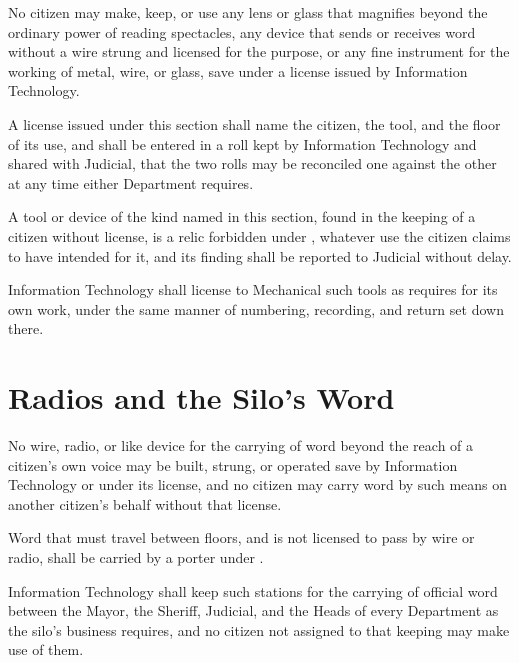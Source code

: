 No citizen may make, keep, or use any lens or glass that magnifies beyond the ordinary power of reading spectacles, any device that sends or receives word without a wire strung and licensed for the purpose, or any fine instrument for the working of metal, wire, or glass, save under a license issued by Information Technology.

\begin{clauses}
\item A license issued under this section shall name the citizen, the tool, and the floor of its use, and shall be entered in a roll kept by Information Technology and shared with Judicial, that the two rolls may be reconciled one against the other at any time either Department requires.
\item A tool or device of the kind named in this section, found in the keeping of a citizen without license, is a relic forbidden under , whatever use the citizen claims to have intended for it, and its finding shall be reported to Judicial without delay.
\item Information Technology shall license to Mechanical such tools as  requires for its own work, under the same manner of numbering, recording, and return set down there.
\end{clauses}

\section{Radios and the Silo's Word}
\label{sec:it:radios-and-the-silos-word}

No wire, radio, or like device for the carrying of word beyond the reach of a citizen's own voice may be built, strung, or operated save by Information Technology or under its license, and no citizen may carry word by such means on another citizen's behalf without that license.

\begin{clauses}
\item Word that must travel between floors, and is not licensed to pass by wire or radio, shall be carried by a porter under .
\item Information Technology shall keep such stations for the carrying of official word between the Mayor, the Sheriff, Judicial, and the Heads of every Department as the silo's business requires, and no citizen not assigned to that keeping may make use of them.
\end{clauses}


